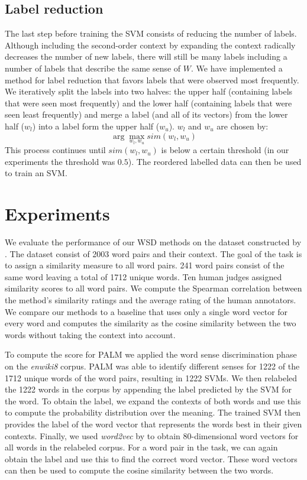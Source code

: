 \documentclass[11pt]{article}
\begin{document}
\subsection{Label reduction}
The last step before training the SVM consists of reducing the number of labels. Although including the second-order context by expanding the context radically decreases the number of new labels, there will still be many labels including a number of labels that describe the same sense of $W$. We have implemented a method for label reduction that favors labels that were observed most frequently. We iteratively split the labels into two halves: the upper half (containing labels that were seen most frequently) and the lower half (containing labels that were seen least frequently) and merge a label (and all of its vectors) from the lower half ($w_l$) into a label form the upper half ($w_u$). $w_l$ and $w_u$ are chosen by: 
$$\arg\max_{w_l, w_u} \textit{sim}(w_l, w_u)$$
This process continues until $\textit{sim}(w_l, w_u)$ is below a certain threshold (in our experiments the threshold was $0.5$).
The reordered labelled data can then be used to train an SVM.

\section{Experiments}
We evaluate the performance of our WSD methods on the dataset constructed by \cite{global}. The dataset consist of 2003 word pairs and their context. The goal of the task is to assign a similarity measure to all word pairs. 241 word pairs consist of the same word leaving a total of 1712 unique words. Ten human judges assigned similarity scores to all word pairs. We compute the Spearman correlation between the method's similarity ratings and the average rating of the human annotators. We compare our methods to a baseline that uses only a single word vector for every word and computes the similarity as the cosine similarity between the two words without taking the context into account. 

To compute the score for PALM we applied the word sense discrimination phase on the \textit{enwiki8} corpus. PALM was able to identify different senses for 1222 of the 1712 unique words of the word pairs, resulting in 1222 SVMs. We then relabeled the 1222 words in the corpus by appending the label predicted by the SVM for the word. To obtain the label, we expand the contexts of both words and use this to compute the probability distribution over the meaning. The trained SVM then provides the label of the word vector that represents the words best in their given contexts. Finally, we used \textit{word2vec} by \cite{word2vec} to obtain 80-dimensional word vectors for all words in the relabeled corpus. For a word pair in the task, we can again obtain the label and use this to find the correct word vector. These word vectors can then be used to compute the cosine similarity between the two words.
\end{document}
